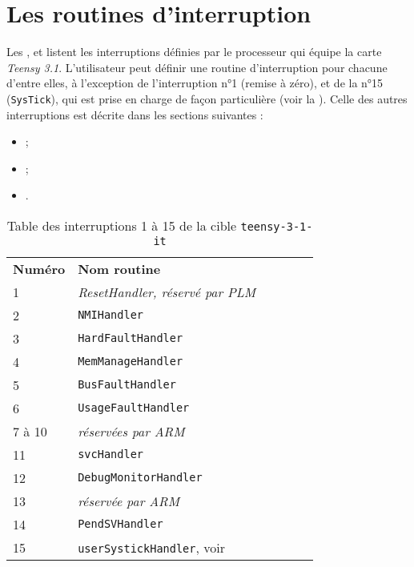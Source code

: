 

\section{Les routines d'interruption}

Les ,  et  listent les interruptions définies par le processeur qui équipe la carte \emph{Teensy 3.1}. L'utilisateur peut définir une routine d'interruption pour chacune d'entre elles, à l'exception de l'interruption n°1 (remise à zéro), et de la n°15 (\texttt{SysTick}), qui est prise en charge de façon particulière (voir la ). Celle des autres interruptions est décrite dans les sections suivantes :
\begin{itemize}
  \item {} ;
  \item {} ;
  \item {}.
\end{itemize}


\begin{table}[!t]
  \centering
  \begin{tabular}{llllll}
    \textbf{Numéro}& \textbf{Nom routine} \\
    1  & \emph{ResetHandler, réservé par PLM} \\
    2  & \texttt{NMIHandler}\\
    3  & \texttt{HardFaultHandler}\\
    4  & \texttt{MemManageHandler}\\
    5  & \texttt{BusFaultHandler}\\
    6  & \texttt{UsageFaultHandler}\\
    7 à 10 & \emph{réservées par ARM} \\
    11 & \texttt{svcHandler}\\
    12 & \texttt{DebugMonitorHandler}\\
    13 & \emph{réservée par ARM} \\
    14 & \texttt{PendSVHandler}\\
    15 & \texttt{userSystickHandler}, voir {SystickPourTeensy31It} \\
  \end{tabular}
  \caption{Table des interruptions 1 à 15 de la cible \texttt{teensy-3-1-it}}
  \ligne
\end{table}

